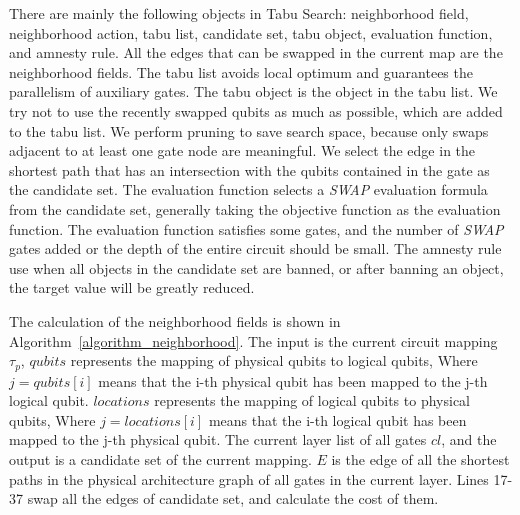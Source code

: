 \documentclass[runningheads]{llncs}
\begin{document}
There are mainly the following objects in Tabu Search: neighborhood field, neighborhood action, tabu list, candidate set, tabu object, evaluation function, and amnesty rule. All the edges that can be swapped in the current map are the neighborhood fields. The tabu list avoids local optimum and guarantees the parallelism of auxiliary gates. The tabu object is the object in the tabu list. We try not to use the recently swapped qubits as much as possible, which are added to the tabu list. We perform pruning to save search space, because only swaps adjacent to at least one gate node are meaningful. We select the edge in the shortest path that has an intersection with the qubits contained in the gate as the candidate set. The evaluation function selects a \textit{SWAP} evaluation formula from the candidate set, 
generally taking the objective function as the evaluation function. The evaluation function satisfies some gates, 
and the number of \textit{SWAP} gates added or the depth of the entire circuit should be small. The amnesty rule use when all objects in the candidate set are banned,  or after banning an object, the target value will be greatly reduced.

The calculation of the neighborhood fields is shown in Algorithm~\ref{algorithm_neighborhood}. The input is the current circuit mapping $\tau_{p}$, $qubits$ represents the mapping of physical qubits to logical qubits, Where $ j = qubits [i] $ means that the i-th physical qubit has been mapped to the j-th logical qubit. $ locations $ represents the mapping of logical qubits to physical qubits, Where $ j = locations [i] $ means that the i-th logical qubit has been mapped to the j-th physical qubit.
The current layer list of all gates $cl$, and the output is a candidate set of the current mapping. $E$ is the edge of all the shortest paths in the physical architecture graph of all gates in the current layer. Lines 17-37 swap all the edges of candidate set, and calculate the cost of them.
\end{document}
